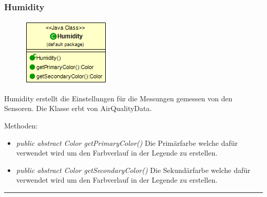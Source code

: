 \subsubsection{Humidity}
\begin{minipage}{0.3\textwidth}
    \begin{figure}[H]
        {\centering\includegraphics[scale = 0.6
        ]{media/view/airquality/Humidity_Class.png}}
    \end{figure}
    \end{minipage} \hfill
    \begin{minipage}{0.6\textwidth}
Humidity erstellt die Einstellungen für die Messungen gemessen von den Sensoren. Die Klasse erbt von AirQualityData.
\end{minipage}
\vspace{\baselineskip}
Methoden: \begin{itemize} [noitemsep]
	\item \emph{public abstract Color getPrimaryColor()} Die Primärfarbe welche dafür verwendet wird um den Farbverlauf in der Legende zu erstellen.
	\item \emph{public abstract Color getSecondaryColor()} Die Sekundärfarbe welche dafür verwendet wird um den Farbverlauf in der Legende zu erstellen.
\end{itemize}

\rule{\textwidth}{0.4pt}

